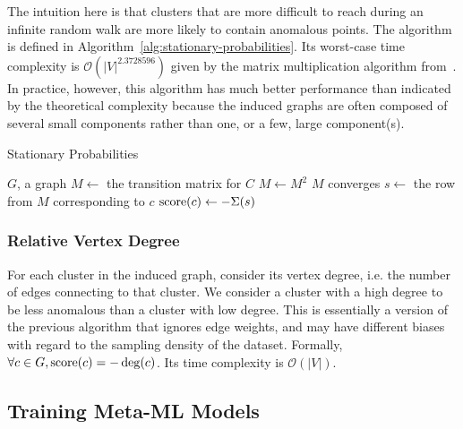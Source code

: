 The intuition here is that clusters that are more difficult to reach during an infinite random walk are more likely to contain anomalous points.
The algorithm is defined in Algorithm~\ref{alg:stationary-probabilities}.
Its worst-case time complexity is $\mathcal{O}(|V|^{2.3728596})$ given by the matrix multiplication algorithm from~\cite{alman2021refined}.
In practice, however, this algorithm has much better performance than indicated by the theoretical complexity because the induced graphs are often composed of several small components rather than one, or a few, large component(s).

\begin{algorithm}[h]
    \caption{Stationary Probabilities}
    \label{alg:stationary-probabilities}
\begin{algorithmic}[1]
    \REQUIRE $G$, a graph
        \STATE $M \gets$ the transition matrix for $C$
        \REPEAT
            \STATE $M \gets M^2$
        \UNTIL $M$ converges
            \STATE $s \gets $ the row from $M$ corresponding to $c$
            \STATE $\operatorname{score}(c) \gets -\Sigma(s)$ 
        \ENDFOR
    \ENDFOR
\end{algorithmic}
\end{algorithm}


\subsubsection{Relative Vertex Degree}
\label{subsubsec:methods:individual-algorithms:relative-vertex-degree}
For each cluster in the induced graph, consider its vertex degree, i.e. the number of edges connecting to that cluster.
We consider a cluster with a high degree to be less anomalous than a cluster with low degree.
This is essentially a version of the previous algorithm that ignores edge weights, and may have different biases with regard to the sampling density of the dataset.
Formally, $\forall c \in G, \operatorname{score}(c) = -\deg(c)$.
Its time complexity is $\mathcal{O}(|V|)$.


\subsection{Training Meta-ML Models}
\label{subsec:methods:training-meta-ml-models}

